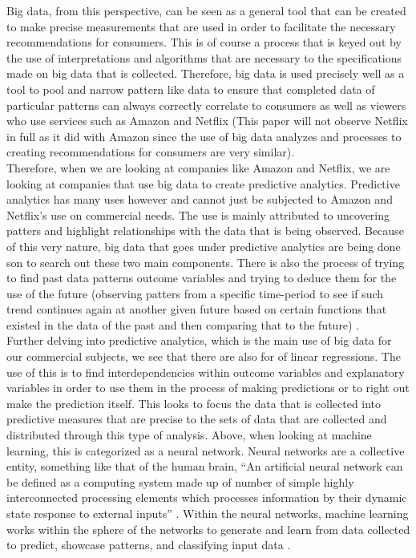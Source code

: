 \documentclass[sigconf]{acmart}
\begin{document}
Big data, from this perspective, can be seen as a general tool that can be created to make precise measurements that are used in order to facilitate the necessary recommendations for consumers. This is of course a process that is keyed out by the use of interpretations and algorithms that are necessary to the specifications made on big data that is collected. Therefore, big data is used precisely well as a tool to pool and narrow pattern like data to ensure that completed data of particular patterns can always correctly correlate to consumers as well as viewers who use services such as Amazon and Netflix (This paper will not observe Netflix in full as it did with Amazon since the use of big data analyzes and processes to creating recommendations for consumers are very similar).\\

Therefore, when we are looking at companies like Amazon and Netflix, we are looking at companies that use big data to create predictive analytics. Predictive analytics has many uses however and cannot just be subjected to Amazon and Netflix’s use on commercial needs. The use is mainly attributed to uncovering patters and highlight relationships with the data that is being observed. Because of this very nature, big data that goes under predictive analytics are being done son to search out these two main components. There is also the process of trying to find past data patterns outcome variables and trying to deduce them for the use of the future (observing patters from a specific time-period to see if such trend continues again at another given future based on certain functions that existed in the data of the past and then comparing that to the future) \cite{4}. \\

Further delving into predictive analytics, which is the main use of big data for our commercial subjects, we see that there are also for of linear regressions. The use of this is to find interdependencies within outcome variables and explanatory variables in order to use them in the process of making predictions or to right out make the prediction itself. This looks to focus the data that is collected into predictive measures that are precise to the sets of data that are collected and distributed through this type of analysis. Above, when looking at machine learning, this is categorized as a neural network. Neural networks are a collective entity, something like that of the human brain, “An artificial neural network can be defined as a computing system made up of number of simple highly interconnected processing elements which processes information by their dynamic state response to external inputs” . Within the neural networks, machine learning works within the sphere of the networks to generate and learn from data collected to predict, showcase patterns, and classifying input data \cite{5}.\\
\end{document}
